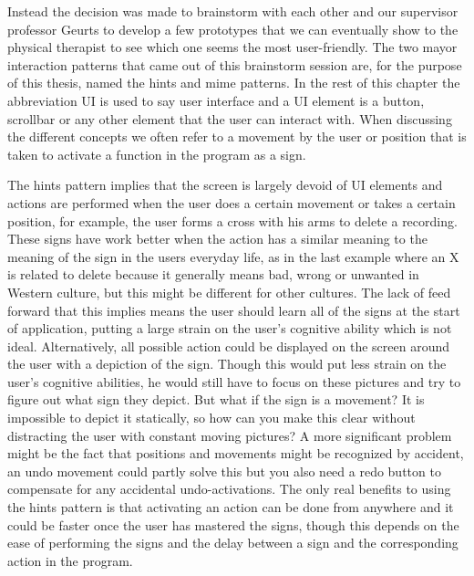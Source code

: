 
Instead the decision was made to brainstorm with each other and our supervisor professor Geurts to develop a few prototypes that we can eventually show to the physical therapist to see which one seems the most user-friendly. The two mayor interaction patterns that came out of this brainstorm session are, for the purpose of this thesis, named the hints and mime patterns. In the rest of this chapter the abbreviation UI is used to say user interface and a UI element is a button, scrollbar or any other element that the user can interact with. When discussing the different concepts we often refer to a movement by the user or position that is taken to activate a function in the program as a sign.

The hints pattern implies that the screen is largely devoid of UI elements and actions are performed when the user does a certain movement or takes a certain position, for example, the user forms a cross with his arms to delete a recording. These signs have work better when the action has a similar meaning to the meaning of the sign in the users everyday life, as in the last example where an X is related to delete because it generally means bad, wrong or unwanted in Western culture, but this might be different for other cultures. The lack of feed forward that this implies means the user should learn all of the signs at the start of application, putting a large strain on the user's cognitive ability which is not ideal. Alternatively, all possible action could be displayed on the screen around the user with a depiction of the sign. Though this would put less strain on the user's cognitive abilities, he would still have to focus on these pictures and try to figure out what sign they depict. But what if the sign is a movement? It is impossible to depict it statically, so how can you make this clear without distracting the user with constant moving pictures? A more significant problem might be the fact that positions and movements might be recognized by accident, an undo movement could partly solve this but you also need a redo button to compensate for any accidental undo-activations. The only real benefits to using the hints pattern is that activating an action can be done from anywhere and it could be faster once the user has mastered the signs, though this depends on the ease of performing the signs and the delay between a sign and the corresponding action in the program.\\

